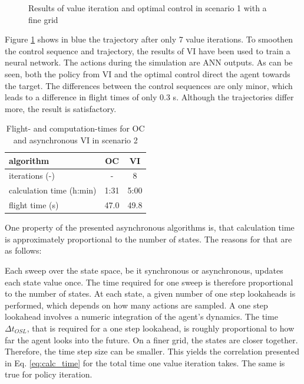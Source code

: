 \begin{figure}[hbt]
	\caption{Results of value iteration and optimal control in scenario 1 with a fine grid}
	\label{tikz:vi500m}
\end{figure}

Figure \ref{tikz:vi500m} shows in blue the trajectory after only 7 value iterations. To smoothen the control sequence and trajectory, the results of VI have been used to train a neural network. The actions during the simulation are ANN outputs. As can be seen, both the policy from VI and the optimal control direct the agent towards the target. The differences between the control sequences are only minor, which leads to a difference in flight times of only 0.3 s. Although the trajectories differ more, the result is satisfactory.

\begin{table}[htb]
	\begin{center}
		\begin{tabular}{l|c c}
			algorithm & OC & VI \\ \hline 
			iterations (-) & - & 8 \\
			calculation time (h:min) & 1:31 & 5:00 \\
			flight time (s) & 47.0 & 49.8
		\end{tabular}
		\caption{Flight- and computation-times for OC and asynchronous VI in scenario 2}
		\label{tab:2d_flight_data_1000m}
	\end{center}
\end{table}
\FloatBarrier

One property of the presented asynchronous algorithms is, that calculation time is approximately proportional to the number of states. The reasons for that are as follows: \smallbreak

Each sweep over the state space, be it synchronous or asynchronous, updates each state value once. The time required for one sweep is therefore proportional to the number of states. At each state, a given number of one step lookaheads is performed, which depends on how many actions are sampled. A one step lookahead involves a numeric integration of the agent's dynamics. The time $\Delta t_{OSL}$, that is required for a one step lookahead, is roughly proportional to how far the agent looks into the future. On a finer grid, the states are closer together. Therefore, the time step size can be smaller. This yields the correlation presented in Eq. \ref{eq:calc_time} for the total time one value iteration takes. The same is true for policy iteration.

